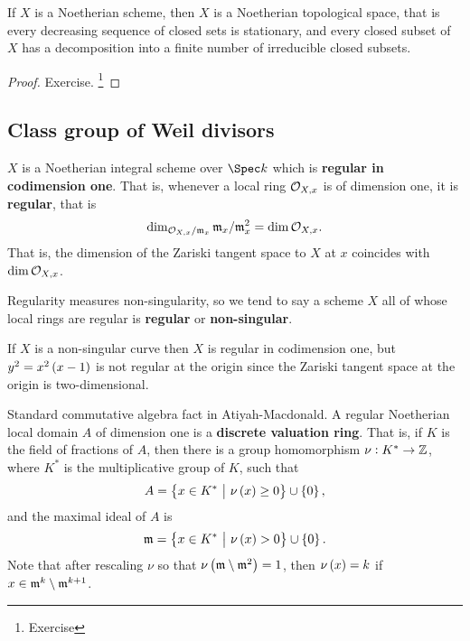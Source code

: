 \begin{proposition}
If $ X $ is a Noetherian scheme, then $ X $ is a Noetherian topological space, that is every decreasing sequence of closed sets is stationary, and every closed subset of $ X $ has a decomposition into a finite number of irreducible closed subsets.
\end{proposition}

\begin{proof}
Exercise. \footnote{Exercise}
\end{proof}

\subsection{Class group of Weil divisors}

\begin{assumption}
\label{ass}
$ X $ is a Noetherian integral scheme over $ \Spec k $ which is \textbf{regular in codimension one}. That is, whenever a local ring $ \mathcal{O}_{X, x} $ is of dimension one, it is \textbf{regular}, that is
$$ \dim_{\mathcal{O}_{X, x} / \mathfrak{m}_x} \mathfrak{m}_x / \mathfrak{m}_x^2 = \dim \mathcal{O}_{X, x}. $$
That is, the dimension of the Zariski tangent space to $ X $ at $ x $ coincides with $ \dim \mathcal{O}_{X, x} $.
\end{assumption}


\begin{remark*}
Regularity measures non-singularity, so we tend to say a scheme $ X $ all of whose local rings are regular is \textbf{regular} or \textbf{non-singular}.
\end{remark*}

\begin{example*}
If $ X $ is a non-singular curve then $ X $ is regular in codimension one, but $ y^2 = x^2\br{x - 1} $ is not regular at the origin since the Zariski tangent space at the origin is two-dimensional.
\end{example*}

\pagebreak

\begin{remark*}
Standard commutative algebra fact in Atiyah-Macdonald. A regular Noetherian local domain $ A $ of dimension one is a \textbf{discrete valuation ring}. That is, if $ K $ is the field of fractions of $ A $, then there is a group homomorphism $ \nu : K^* \to \mathbb{Z} $, where $ K^* $ is the multiplicative group of $ K $, such that
$$ A = \cbr{x \in K^* \st \nu\br{x} \ge 0} \cup \cbr{0}, $$
and the maximal ideal of $ A $ is
$$ \mmm = \cbr{x \in K^* \st \nu\br{x} > 0} \cup \cbr{0}. $$
Note that after rescaling $ \nu $ so that $ \nu\br{\mmm \setminus \mmm^2} = 1 $, then $ \nu\br{x} = k $ if $ x \in \mathfrak{m}^k \setminus \mathfrak{m}^{k + 1} $.
\end{remark*}

